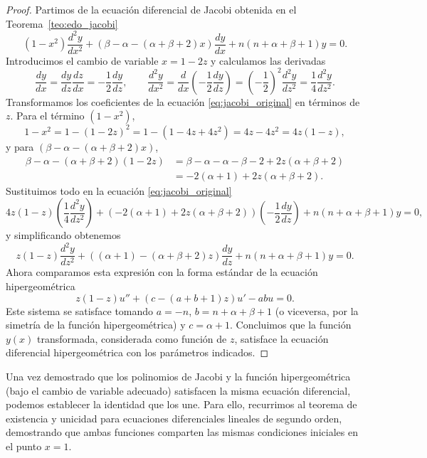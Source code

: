 \documentclass[12pt,a4paper]{book}
\begin{document}
\begin{proof}
Partimos de la ecuación diferencial de Jacobi obtenida en el Teorema~\ref{teo:edo_jacobi}
\begin{equation}
    (1-x^2)\frac{d^2y}{dx^2} + (\beta - \alpha - (\alpha+\beta+2)x)\frac{dy}{dx} + n(n+\alpha+\beta+1)y = 0.
    \label{eq:jacobi_original}
\end{equation}
Introducimos el cambio de variable $x = 1-2z$ y calculamos las derivadas 
\[
    \frac{dy}{dx} = \frac{dy}{dz}\frac{dz}{dx} = -\frac{1}{2}\frac{dy}{dz}, \quad \quad \frac{d^2y}{dx^2} = \frac{d}{dx}\left(-\frac{1}{2}\frac{dy}{dz}\right) = \left(-\frac{1}{2}\right)^2 \frac{d^2y}{dz^2} = \frac{1}{4}\frac{d^2y}{dz^2}.
\]
Transformamos los coeficientes de la ecuación \eqref{eq:jacobi_original} en términos de $z$.
Para el término $(1-x^2)$,
    \[
    1 - x^2 = 1 - (1-2z)^2 = 1 - (1 - 4z + 4z^2) = 4z - 4z^2 = 4z(1-z),
    \]
y para $(\beta - \alpha - (\alpha+\beta+2)x)$,
    \begin{align*}
    \beta - \alpha - (\alpha+\beta+2)(1-2z) &= \beta - \alpha - \alpha - \beta - 2 + 2z(\alpha+\beta+2) \\
    &= -2(\alpha+1) + 2z(\alpha+\beta+2).
    \end{align*}
Sustituimos todo en la ecuación \eqref{eq:jacobi_original}
\[
4z(1-z) \left(\frac{1}{4}\frac{d^2y}{dz^2}\right) + (-2(\alpha+1) + 2z(\alpha+\beta+2)) \left(-\frac{1}{2}\frac{dy}{dz}\right) + n(n+\alpha+\beta+1)y = 0,
\]
y simplificando obtenemos
\[
z(1-z)\frac{d^2y}{dz^2} + ((\alpha+1) - (\alpha+\beta+2)z)\frac{dy}{dz} + n(n+\alpha+\beta+1)y = 0.
\]
Ahora comparamos esta expresión con la forma estándar de la ecuación hipergeométrica 
\[
z(1-z)u'' + (c - (a+b+1)z)u' - abu = 0.
\]
Este sistema se satisface tomando $a = -n$, $b = n+\alpha+\beta+1$ (o viceversa, por la simetría de la función hipergeométrica) y $c = \alpha+1$.
Concluimos que la función $y(x)$ transformada, considerada como función de $z$, satisface la ecuación diferencial hipergeométrica con los parámetros indicados.
\end{proof}

Una vez demostrado que los polinomios de Jacobi y la función hipergeométrica (bajo el cambio de variable adecuado) satisfacen la misma ecuación diferencial, podemos establecer la identidad que los une. Para ello, recurrimos al teorema de existencia y unicidad para ecuaciones diferenciales lineales de segundo orden, demostrando que ambas funciones comparten las mismas condiciones iniciales en el punto $x=1$.
\end{document}
